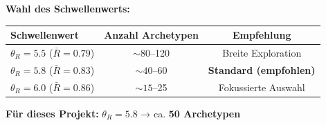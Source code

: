 \begin{tcolorbox}[colback=yellow!5!white, colframe=yellow!75!black,
    title=\textbf{Schritt 4: Schwellenwert $\theta_R$ setzen und selektieren}]

\textbf{Wahl des Schwellenwerts:}

\begin{center}
\begin{tabular}{@{}lcc@{}}
\toprule
\textbf{Schwellenwert} & \textbf{Anzahl Archetypen} & \textbf{Empfehlung} \\
\midrule
$\theta_R = 5.5$ ($\bar{R} = 0.79$) & $\sim 80$--120 & Breite Exploration \\
$\theta_R = 5.8$ ($\bar{R} = 0.83$) & $\sim 40$--60 & \textbf{Standard (empfohlen)} \\
$\theta_R = 6.0$ ($\bar{R} = 0.86$) & $\sim 15$--25 & Fokussierte Auswahl \\
\bottomrule
\end{tabular}
\end{center}

\textbf{Für dieses Projekt:} $\theta_R = 5.8$ → ca. \textbf{50 Archetypen}

\end{tcolorbox}

